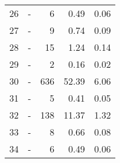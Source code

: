 \begin{longtable}{lXrrr}
        26 & \multicolumn{1}{X}{-} & %
          \num{6} &
          \num[round-mode=places,round-precision=2]{0.49} &
          \num[round-mode=places,round-precision=2]{0.06} \\

        27 & \multicolumn{1}{X}{-} & %
          \num{9} &
          \num[round-mode=places,round-precision=2]{0.74} &
          \num[round-mode=places,round-precision=2]{0.09} \\

        28 & \multicolumn{1}{X}{-} & %
          \num{15} &
          \num[round-mode=places,round-precision=2]{1.24} &
          \num[round-mode=places,round-precision=2]{0.14} \\

        29 & \multicolumn{1}{X}{-} & %
          \num{2} &
          \num[round-mode=places,round-precision=2]{0.16} &
          \num[round-mode=places,round-precision=2]{0.02} \\

        30 & \multicolumn{1}{X}{-} & %
          \num{636} &
          \num[round-mode=places,round-precision=2]{52.39} &
          \num[round-mode=places,round-precision=2]{6.06} \\

        31 & \multicolumn{1}{X}{-} & %
          \num{5} &
          \num[round-mode=places,round-precision=2]{0.41} &
          \num[round-mode=places,round-precision=2]{0.05} \\

        32 & \multicolumn{1}{X}{-} & %
          \num{138} &
          \num[round-mode=places,round-precision=2]{11.37} &
          \num[round-mode=places,round-precision=2]{1.32} \\

        33 & \multicolumn{1}{X}{-} & %
          \num{8} &
          \num[round-mode=places,round-precision=2]{0.66} &
          \num[round-mode=places,round-precision=2]{0.08} \\

        34 & \multicolumn{1}{X}{-} & %
          \num{6} &
          \num[round-mode=places,round-precision=2]{0.49} &
          \num[round-mode=places,round-precision=2]{0.06} \\


\end{longtable}
